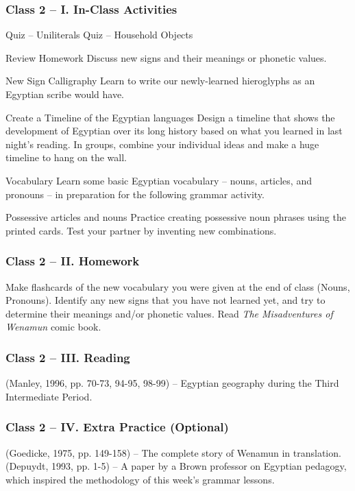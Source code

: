 \documentclass[11pt]{article}
\begin{document}
		\subsubsection*{Class 2 -- I. In-Class Activities}
			\begin{outline}[itemize]
				\1 Quiz -- Uniliterals
				\1 Quiz -- Household Objects
				
				\1 Review Homework
					\2 Discuss new signs and their meanings or phonetic values.
				
				\1 New Sign Calligraphy
					\2 Learn to write our newly-learned hieroglyphs as an Egyptian scribe would have.
				
				\1 Create a Timeline of the Egyptian languages
					\2 Design a timeline that shows the development of Egyptian over its long history
						based on what you learned in last night's reading.
					\2 In groups, combine your individual ideas and make a huge timeline to hang on the wall.
				
				\1 Vocabulary
					\2 Learn some basic Egyptian vocabulary -- nouns, articles, and pronouns -- in preparation for the following grammar activity.
					
				\1 Possessive articles and nouns
					\2 Practice creating possessive noun phrases using the printed cards.
					\2 Test your partner by inventing new combinations.
					
			\end{outline}
			
		\subsubsection*{Class 2 -- II. Homework}
			Make flashcards of the new vocabulary you were given at the end of class (Nouns, Pronouns).
			Identify any new signs that you have not learned yet, and try to determine their meanings and/or phonetic values.
			Read \emph{The Misadventures of Wenamun} comic book.
			
		\subsubsection*{Class 2 -- III. Reading}
			(Manley, 1996, pp. 70-73, 94-95, 98-99) -- Egyptian geography during the Third Intermediate Period.
			
		\subsubsection*{Class 2 -- IV. Extra Practice (Optional)}
			(Goedicke, 1975, pp. 149-158) -- The complete story of Wenamun in translation.\\
			(Depuydt, 1993, pp. 1-5) -- A paper by a Brown professor on Egyptian pedagogy, 
				which inspired the methodology of this week's grammar lessons.
			
\end{document}
